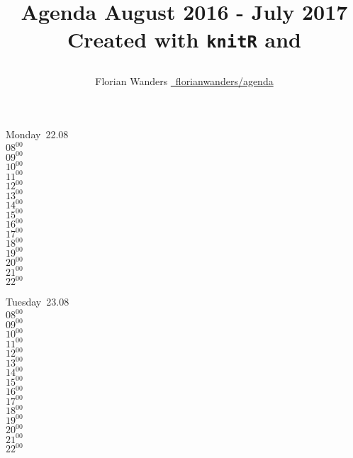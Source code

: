 \documentclass[11pt,a4paper]{book}\usepackage[]{graphicx}\usepackage[]{color}
\def\lsin{\lstinline[basicstyle=\ttfamily,breaklines=true,]}%for inline verbatim
\begin{document}
\begin{titlepage}
\title{\parbox{\linewidth}{%
  \centering%
  Agenda\endgraf
  August 2016 - July 2017\endgraf\bigskip
  Created with \lsin{knitR} and \XeLaTeX
  }
}
\author{\parbox{\linewidth}{%
  \centering%
  Florian Wanders\endgraf\bigskip
  \href{https://github.com/FlorianWanders/agenda}{\faGithub~florianwanders/agenda}
  }
}
\date{}
\maketitle
\end{titlepage}


\begin{headerbox}
\end{headerbox}
\begin{weekdaybox}
  Monday~22.08\\
  { 
  \vfill
  $08^{00}$\\
$09^{00}$\\
$10^{00}$\\
$11^{00}$\\
$12^{00}$\\
$13^{00}$\\
$14^{00}$\\
$15^{00}$\\
$16^{00}$\\
$17^{00}$\\
$18^{00}$\\
$19^{00}$\\
$20^{00}$\\
$21^{00}$\\
$22^{00}$\\
  }
\end{weekdaybox}
\begin{weekdaybox}
  Tuesday~23.08\\
  { 
  \vfill
  $08^{00}$\\
$09^{00}$\\
$10^{00}$\\
$11^{00}$\\
$12^{00}$\\
$13^{00}$\\
$14^{00}$\\
$15^{00}$\\
$16^{00}$\\
$17^{00}$\\
$18^{00}$\\
$19^{00}$\\
$20^{00}$\\
$21^{00}$\\
$22^{00}$\\
  }
\end{weekdaybox}
\end{document}
